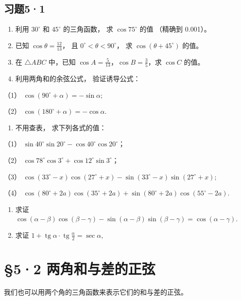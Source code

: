 \subsection{习题5·1}

\begin{enumerate}
\item
  利用 \(30^{\circ}\) 和 \(45^{\circ}\) 的三角函数， 求
  \(\cos 75^{\circ}\) 的值 （精确到 0.001）。
\item
  已知 \(\cos \theta = \frac{12}{13}\)， 且
  \(0^\circ < \theta < 90^\circ\)， 求 \(\cos (\theta + 45^\circ)\)
  的值。
\item
  在 \(\triangle ABC\) 中，已知
  \(\cos A = \frac{5}{13}\)，\(\cos B = \frac{3}{5}\)，求 \(\cos C\)
  的值。
\item
  利用两角和的余弦公式， 验证诱导公式：
\end{enumerate}

（1） \(\cos (90^{\circ} + \alpha) = -\sin \alpha ;\)

（2） \(\cos (180^{\circ} + \alpha) = -\cos \alpha.\)

\begin{enumerate}[start=5]
\item
  不用查表， 求下列各式的值：
\end{enumerate}

（1）
\(\sin 40^{\circ} \sin 20^{\circ} - \cos 40^{\circ} \cos 20^{\circ}\)；

（2）
\(\cos 78^{\circ} \cos 3^{\circ} + \cos 12^{\circ} \sin 3^{\circ}\)；

（3）
\(\cos (33^{\circ} - x)\cos (27^{\circ} + x) - \sin (33^{\circ} - x)\sin (27^{\circ} + x);\)

（4）
\(\cos (80^{\circ} + 2a)\cos (35^{\circ} + 2a) + \sin (80^{\circ} + 2a)\cos (55^{\circ} - 2a)\).

\begin{enumerate}[start=6]
\item
  求证
  \(\cos (\alpha -\beta)\cos (\beta -\gamma) - \sin (\alpha -\beta)\sin (\beta -\gamma) = \cos (\alpha -\gamma)\).
\item
  求证
  \(1 + \operatorname{tg} \alpha \cdot \operatorname{tg} \frac{\alpha}{2} = \sec \alpha,\)
\end{enumerate}

\section{§5·2 两角和与差的正弦}

我们也可以用两个角的三角函数来表示它们的和与差的正弦。

